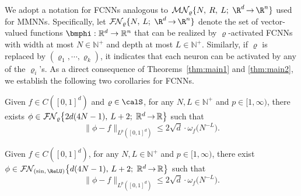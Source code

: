 \documentclass[11pt,a4paper]{article}
\let\dots\cdots
\begin{document}

We adopt a notation for FCNNs analogous to \(\mn{\varrho}{N}{R}{L}{\R^d}{\R^n}\) used for MMNNs. Specifically, let \(\nn{\varrho}{N}{L}{\R^d}{\R^n}\) denote the set of vector-valued functions \(\bmphi: \mathbb{R}^d \to \mathbb{R}^n\) that can be realized by \(\varrho\)-activated FCNNs with width at most \(N \in \mathbb{N}^+\) and depth at most \(L \in \mathbb{N}^+\).
Similarly, if \(\varrho\) is replaced by \((\varrho_1,\dots,\varrho_k)\), it indicates that each neuron can be activated by any of the \(\varrho_i\)'s.
As a direct consequence of Theorems~\ref{thm:main1} and \ref{thm:main2}, we establish the following two corollaries for FCNNs.



\begin{corollary}
\label{coro:main1}
Given $f \in C([0,1]^d)$ and $\varrho\in\calS$, for any $N,L \in \mathbb{N}^+$ and $p \in [1,\infty)$, there exists  
$\phi\in \nn[\big]{\varrho}{2d(4N-1)}{L+2}{\mathbb{R}^d}{\mathbb{R}}$
such that
\[
\| \phi - f\|_{L^p([0,1]^d)} \leq  2\sqrt{d}\cdot\omega_f\big(N^{-L}\big).
\]
\end{corollary}

\begin{corollary}
\label{coro:main2}
Given $f \in C([0,1]^d)$, for any $N,L \in \mathbb{N}^+$ and $p \in [1,\infty)$, there exist  
$\phi\in \nn[\big]{(\sin,\,\ReLU)}{d(4N-1)}{L+2}{\mathbb{R}^d}{\mathbb{R}}$
such that
\[
\| \phi - f\|_{L^p([0,1]^d)} \leq  2\sqrt{d}\cdot\omega_f\big(N^{-L}\big).
\]
\end{corollary}

\end{document}
